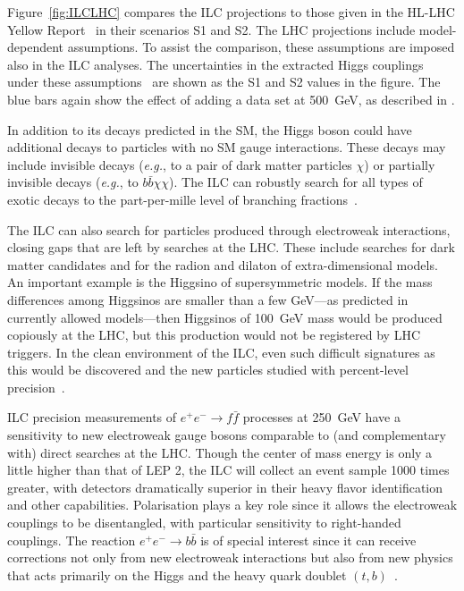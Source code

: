 \documentclass[%
 reprint,
 floatfix,
 amsmath,amssymb,
 aps,
]{revtex4-1}
\def\eg{{\it e.g.}}
\def\ee{e^+e^-}
\begin{document}
Figure~\ref{fig:ILCLHC} compares the ILC projections to those given in the
HL-LHC Yellow Report~\cite{Yellow} in their scenarios S1
and S2. The LHC projections include
model-dependent assumptions.  To assist the comparison,
these assumptions are imposed also in the ILC analyses. The 
uncertainties in the extracted Higgs couplings under these 
assumptions~\cite{ILCforESS} are shown as the  S1 and S2 values in the figure. The blue bars again show the effect of adding a data set at 
500~GeV, as described in \cite{ILCforESS}.


In addition to its decays predicted in the SM, the Higgs boson could have additional decays 
to particles with no SM gauge interactions.    These decays may
include invisible decays (\eg, to a pair of dark matter particles $\chi$)  or
partially invisible decays (\eg, to $b\bar b \chi \chi$).   The ILC
can robustly search for all types of exotic decays  to the 
part-per-mille level of branching fractions~\cite{Liu:2016zki}.

The ILC can also search for particles produced through electroweak
interactions, closing gaps that are left by searches at the LHC. These include searches for dark matter candidates and for the radion and dilaton of extra-dimensional models. An
important example is the Higgsino of supersymmetric models.   If the
mass  differences among Higgsinos are smaller than a few GeV---as predicted in currently allowed models---then Higgsinos
of 100~GeV mass would be produced copiously at the LHC, but this
production would not be registered by LHC triggers.  In the clean
environment 
of the ILC, even such difficult signatures as this 
would be discovered and the new particles 
studied with percent-level precision~\cite{Higgsino}.

ILC precision measurements of $\ee\to f\bar f$ processes at 250~GeV have a sensitivity to new
electroweak gauge bosons comparable to (and complementary with) 
direct searches at the LHC. Though the center of mass energy is only a little higher than that of LEP 2, the ILC will collect an event sample 1000 times greater, with detectors dramatically superior in their heavy flavor identification and other capabilities.  Polarisation plays a
key role since it allows  the electroweak couplings to be
disentangled, with particular 
sensitivity to right-handed couplings.   The reaction $\ee\to b\bar b$ 
is of special interest since it can receive corrections not only from new electroweak interactions but also from new physics 
that acts primarily on the Higgs and the heavy quark doublet $(t,b)$~\cite{eetobb1,eetobb2}. 
\end{document}
